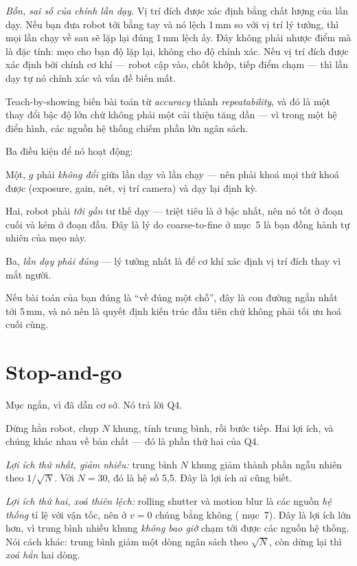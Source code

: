 \documentclass[../../marker.tex]{subfiles}
\begin{document}
\emph{Bốn, sai số của chính lần dạy.} Vị trí đích được xác định bằng chất lượng của lần dạy. Nếu bạn đưa robot tới bằng tay và nó lệch 1\,mm so với vị trí lý tưởng, thì mọi lần chạy về sau sẽ lặp lại đúng 1\,mm lệch ấy. Đây không phải nhược điểm mà là đặc tính: mẹo cho bạn độ lặp lại, không cho độ chính xác. Nếu vị trí đích được xác định bởi chính cơ khí --- robot cập vào, chốt khớp, tiếp điểm chạm --- thì lần dạy tự nó chính xác và vấn đề biến mất.

\begin{cannho}
Teach-by-showing biến bài toán từ \emph{accuracy} thành \emph{repeatability}, và đó là một thay đổi bậc độ lớn chứ không phải một cải thiện tăng dần --- vì trong một hệ điển hình, các nguồn hệ thống chiếm phần lớn ngân sách.

Ba điều kiện để nó hoạt động:

Một, \(g\) phải \emph{không đổi} giữa lần dạy và lần chạy --- nên phải khoá mọi thứ khoá được (exposure, gain, nét, vị trí camera) và dạy lại định kỳ.

Hai, robot phải \emph{tới gần} tư thế dạy --- triệt tiêu là ở bậc nhất, nên nó tốt ở đoạn cuối và kém ở đoạn đầu. Đây là lý do coarse-to-fine ở mục~5 là bạn đồng hành tự nhiên của mẹo này.

Ba, \emph{lần dạy phải đúng} --- lý tưởng nhất là để cơ khí xác định vị trí đích thay vì mắt người.

Nếu bài toán của bạn đúng là ``về đúng một chỗ'', đây là con đường ngắn nhất tới 5\,mm, và nó nên là quyết định kiến trúc đầu tiên chứ không phải tối ưu hoá cuối cùng.
\end{cannho}

\section{Stop-and-go}

Mục ngắn, vì  đã dẫn cơ sở. Nó trả lời Q4.

Dừng hẳn robot, chụp \(N\) khung, tính trung bình, rồi bước tiếp. Hai lợi ích, và chúng khác nhau về bản chất --- đó là phần thứ hai của Q4.

\emph{Lợi ích thứ nhất, giảm nhiễu:} trung bình \(N\) khung giảm thành phần ngẫu nhiên theo \(1/\sqrt{N}\). Với \(N = 30\), đó là hệ số 5,5. Đây là lợi ích ai cũng biết.

\emph{Lợi ích thứ hai, xoá thiên lệch:} rolling shutter và motion blur là các nguồn \emph{hệ thống} tỉ lệ với vận tốc, nên ở \(v = 0\) chúng bằng không ( mục~7). Đây là lợi ích lớn hơn, vì trung bình nhiều khung \emph{không bao giờ} chạm tới được các nguồn hệ thống. Nói cách khác: trung bình giảm một dòng ngân sách theo \(\sqrt{N}\), còn dừng lại thì \emph{xoá hẳn} hai dòng.
\end{document}
